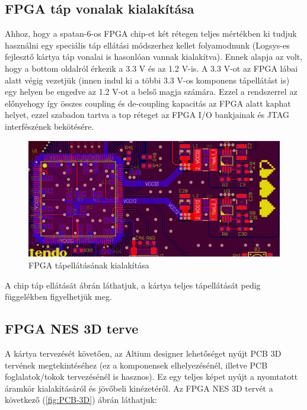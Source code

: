 	\subsection{FPGA táp vonalak kialakítása}
	
	Ahhoz, hogy a spatan-6-os FPGA chip-et két rétegen teljes mértékben ki tudjuk használni egy speciális táp ellátási módszerhez kellet folyamodnunk (Logsys-es fejlesztő kártya táp vonalai is hasonlóan vannak kialakítva). Ennek alapja az volt, hogy a bottom oldalról érkezik a 3.3 V és az 1.2 V-is. A 3.3 V-ot az FPGA lábai alatt végig vezetjük (innen indul ki a többi 3.3 V-os komponens tápellátást is) egy helyen be engedve az 1.2 V-ot a belső magja számára. Ezzel a rendszerrel az előnyehogy így összes coupling és de-coupling kapacitás az FPGA alatt kaphat helyet, ezzel szabadon tartva a top réteget az FPGA I/O bankjainak és JTAG interfészének bekötésére.
	
	\begin{figure}[H]
		\centering
		\includegraphics[width=150mm, keepaspectratio]{figures/FPGA-PSU-routing}
		\caption{FPGA tápellátásának kialakítása}
		\label{fig:FPGA-PSU-routing}
	\end{figure}
	
	A chip táp ellátását  ábrán láthatjuk, a kártya teljes tápellátását pedig  függelékben figyelhetjük meg. 
	
	\subsection{FPGA NES 3D terve}
	
	A kártya tervezését követően, az Altium designer lehetőséget nyújt PCB 3D tervének megtekintéséhez (ez a komponensek elhelyezésénél, illetve PCB foglalatok/tokok tervezésénél is hasznos). Ez egy teljes képet nyújt a nyomtatott áramkör kialakításáról és jövőbeli kinézetéről. Az FPGA NES 3D tervét a következő (\ref{fig:PCB-3D}) ábrán láthatjuk:  
	
